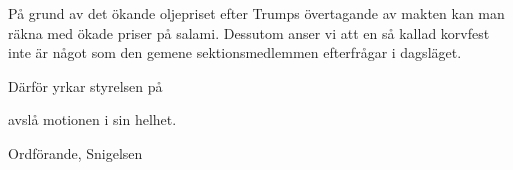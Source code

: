 \documentclass[../_main/handlingar.tex]{subfiles}
\begin{document}
\motionssvar

På grund av det ökande oljepriset efter Trumps övertagande av makten kan man räkna med ökade priser på salami. Dessutom anser vi att en så kallad korvfest inte är något som den gemene sektionsmedlemmen efterfrågar i dagsläget.

Därför yrkar styrelsen på

\begin{attsatser}
    \att avslå motionen i sin helhet.
\end{attsatser}

\begin{signatures}{1}
    \ist
    \signature{Fredrik Peterson}{Ordförande, Snigelsen}
\end{signatures}
\end{document}
